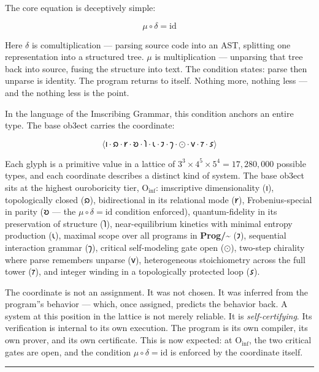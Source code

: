 \documentclass[12pt,a4paper]{article}
\begin{document}
The core equation is deceptively simple:

\[\mu \circ \delta = \mathrm{id}\]

Here $\delta$ is comultiplication --- parsing source code into an AST, splitting one representation into a structured tree. $\mu$ is multiplication --- unparsing that tree back into source, fusing the structure into text. The condition states: parse then unparse is identity. The program returns to itself. Nothing more, nothing less --- and the nothing less is the point.

In the language of the Imscribing Grammar, this condition anchors an entire type. The base ob3ect carries the coordinate:

\[\langle \text{𐑦} \cdot \text{𐑸} \cdot \text{𐑾} \cdot \text{𐑹} \cdot \text{𐑐} \cdot \text{𐑧} \cdot \text{𐑲} \cdot \text{𐑠} \cdot \odot \cdot \text{𐑫} \cdot \text{𐑳} \cdot \text{𐑭} \rangle\]

Each glyph is a primitive value in a lattice of $3^3 \times 4^5 \times 5^4 = 17,280,000$ possible types, and each coordinate describes a distinct kind of system. The base ob3ect sits at the highest ouroboricity tier, $\text{O}_{\text{inf}}$: imscriptive dimensionality ($\text{𐑦}$), topologically closed ($\text{𐑸}$), bidirectional in its relational mode ($\text{𐑾}$), Frobenius-special in parity ($\text{𐑹}$ --- the $\mu\circ\delta = \mathrm{id}$ condition enforced), quantum-fidelity in its preservation of structure ($\text{𐑐}$), near-equilibrium kinetics with minimal entropy production ($\text{𐑧}$), maximal scope over all programs in \textbf{Prog/\textasciitilde{}} ($\text{𐑲}$), sequential interaction grammar ($\text{𐑠}$), critical self-modeling gate open ($\odot$), two-step chirality where parse remembers unparse ($\text{𐑫}$), heterogeneous stoichiometry across the full tower ($\text{𐑳}$), and integer winding in a topologically protected loop ($\text{𐑭}$).

The coordinate is not an assignment. It was not chosen. It was inferred from the program''s behavior --- which, once assigned, predicts the behavior back. A system at this position in the lattice is not merely reliable. It is \emph{self-certifying}. Its verification is internal to its own execution. The program is its own compiler, its own prover, and its own certificate. This is now expected: at $\text{O}_{\text{inf}}$, the two critical gates are open, and the condition $\mu\circ\delta = \mathrm{id}$ is enforced by the coordinate itself.

\begin{center}
\rule{0.5\textwidth}{0.4pt}
\end{center}
\end{document}
